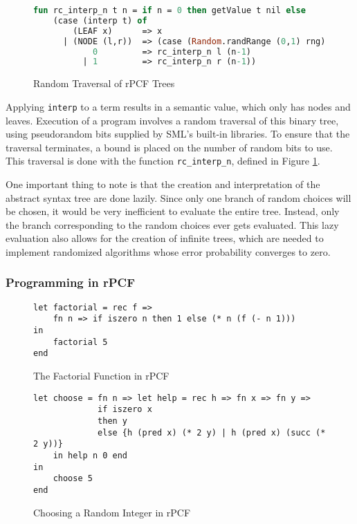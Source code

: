 \begin{figure}
\begin{lstlisting}[language=ML]
fun rc_interp_n t n = if n = 0 then getValue t nil else
    (case (interp t) of
        (LEAF x)      => x
      | (NODE (l,r))  => (case (Random.randRange (0,1) rng) of
            0         => rc_interp_n l (n-1)
          | 1         => rc_interp_n r (n-1))
\end{lstlisting}
\caption{Random Traversal of rPCF Trees} \label{rcinterp}
\end{figure}

Applying \texttt{interp} to a term results in a semantic value, which only has nodes and leaves.  Execution of a program involves a random traversal of this binary tree, using pseudorandom bits supplied by SML's built-in libraries.  To ensure that the traversal terminates, a bound is placed on the number of random bits to use.  This traversal is done with the function \texttt{rc\_interp\_n}, defined in Figure \ref{rcinterp}.

One important thing to note is that the creation and interpretation of the abstract syntax tree are done lazily.  Since only one branch of random choices will be chosen, it would be very inefficient to evaluate the entire tree.  Instead, only the branch corresponding to the random choices ever gets evaluated.  This lazy evaluation also allows for the creation of infinite trees, which are needed to implement randomized algorithms whose error probability converges to zero.

\subsubsection{Programming in rPCF}

\begin{figure}
\begin{lstlisting}[language=rPCF]
let factorial = rec f =>
	fn n => if iszero n then 1 else (* n (f (- n 1)))
in
    factorial 5  
end
\end{lstlisting}
\caption{The Factorial Function in rPCF} \label{rpcffactorial}
\end{figure}

\begin{figure}
\begin{lstlisting}[language=rPCF]
let choose = fn n => let help = rec h => fn x => fn y => 
             if iszero x 
             then y 
             else {h (pred x) (* 2 y) | h (pred x) (succ (* 2 y))} 
    in help n 0 end
in
    choose 5
end
\end{lstlisting}
\caption{Choosing a Random Integer in rPCF} \label{rpcfchoose}
\end{figure}

